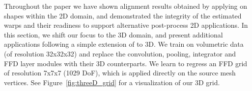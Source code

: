 \documentclass[acmtog,timestamp]{acmart}%
\newcommand{\jsubfig}[2]{%
	\sbox\jsavebox{#1}%
	\parbox[t]{\wd\jsavebox}{\centering\usebox\jsavebox\\#2}%
	}
\begin{document}
\begin{comment}
   \jsubfig{\texttt{[image: \{figures/stress\_test/vase/sample001\_source.png]}}}{} \;
   \hfill \jsubfig{\texttt{[image: figures/stress\_test/vase/sample013\_targetPred.png]}} \; %
   \hfill \jsubfig{\texttt{[image: figures/stress\_test/vase/sample002\_targetPred.png]}} \; %
   \hfill \jsubfig{\texttt{[image: figures/stress\_test/vase/sample003\_targetPred.png]}} \; %
   \hfill \jsubfig{\texttt{[image: figures/stress\_test/vase/sample004\_targetPred.png]}} \; %
   \hfill \jsubfig{\texttt{[image: figures/stress\_test/vase/sample005\_targetPred.png]}} \; %
   \hfill \jsubfig{\texttt{[image: figures/stress\_test/vase/sample006\_targetPred.png]}} \; %
   \hfill \jsubfig{\texttt{[image: figures/stress\_test/vase/sample007\_targetPred.png]}} \; %
   \hfill \jsubfig{\texttt{[image: figures/stress\_test/vase/sample009\_targetPred.png]}} \; %
   \hfill \jsubfig{\texttt{[image: figures/stress\_test/vase/sample010\_targetPred.png]}} \; %
   
   \\
\jsubfig{\texttt{[image: \{figures/novel\_class/line.png]}}}{}%
\\
\end{comment}%
Throughout the paper we have shown alignment results obtained by applying \ourmethod{} on shapes within the 2D domain, and demonstrated the integrity of the estimated warps and their readiness to support alternative post-process 2D applications.
In this section, we shift our focus to the 3D domain, and present additional applications following a simple extension of \ourmethod{} to 3D. We train on volumetric data (of resolution 32x32x32) and replace the convolution, pooling, integrator and FFD layer modules with their 3D counterparts. We learn to regress an FFD grid of resolution 7x7x7 (1029 DoF), which is applied directly on the source mesh vertices.  See Figure~\ref{fig:threeD_grid} for a visualization of our 3D grid.
\end{document}
